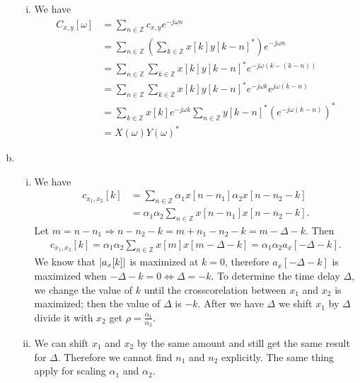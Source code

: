 \begin{enumerate}[(a)]
\begin{enumerate}[i.]
	\item We have
	\begin{align*}
		C_{x,y}[\omega]
		&= \sum_{n \in \mathbb{Z}} c_{x,y} e^{-j \omega n} \\
		&= \sum_{n \in \mathbb{Z}} \left(\sum_{k \in \mathbb{Z}} x[k] y[k-n]^*\right) e^{-j \omega n} \\
		&= \sum_{n \in \mathbb{Z}} \sum_{k \in \mathbb{Z}} x[k] y[k-n]^* e^{-j \omega (k - (k-n))} \\
		&= \sum_{n \in \mathbb{Z}} \sum_{k \in \mathbb{Z}} x[k] y[k-n]^* e^{-j \omega k} e^{j \omega (k-n)} \\
		&= \sum_{k \in \mathbb{Z}} x[k] e^{-j \omega k} \sum_{n \in \mathbb{Z}} y[k-n]^* \left(e^{-j \omega (k-n)}\right)^* \\
		&= X(\omega)Y(\omega)^*
	\end{align*}
\end{enumerate}

\item 
\begin{enumerate}[i.]
	\item We have
	\begin{align*}
	c_{x_1, x_2}[k]
	&= \sum_{n \in \mathbb{Z}} \alpha_1 x[n - n_1] \alpha_2 x[n - n_2 - k] \\
	&= \alpha_1 \alpha_2 \sum_{n \in \mathbb{Z}} x[n - n_1] x[n - n_2 - k].
	\end{align*}
	Let $m = n - n_1 \Rightarrow n - n_2 - k = m + n_1 - n_2 - k = m - \Delta - k$. Then
	\begin{align*}
	c_{x_1, x_2}[k] = \alpha_1 \alpha_2 \sum_{n \in \mathbb{Z}} x[m] x[m - \Delta - k] = \alpha_1 \alpha_2 a_x[-\Delta - k].
	\end{align*}
	We know that $\left\lvert a_x[k] \right\rvert$ is maximized at $k = 0$, therefore $a_x[-\Delta -k]$ is maximized when $-\Delta - k = 0 \Leftrightarrow \Delta = - k$. To determine the time delay $\Delta$, we change the value of $k$ until the crosscorelation between $x_1$ and $x_2$ is maximized; then the value of $\Delta$ is $-k$. After we have $\Delta$ we shift $x_1$ by $\Delta$ divide it with $x_2$ get $\rho = \frac{\alpha_1}{\alpha_2}$.
	
	\item We can shift $x_1$ and $x_2$ by the same amount and still get the same result for $\Delta$. Therefore we cannot find $n_1$ and $n_2$ explicitly. The same thing apply for scaling $\alpha_1$ and $\alpha_2$.
\end{enumerate}
\end{enumerate}